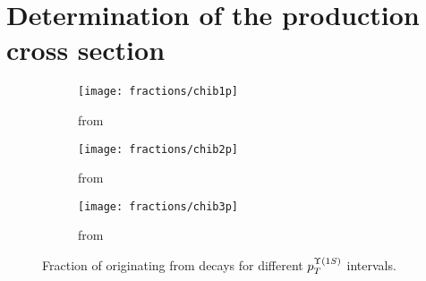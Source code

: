 \section{Determination of the \chib production cross section}
\label{sec:crosssec}

\begin{figure}[H]
  \centering
    \begin{subfigure}[b]{0.31\textwidth}
      \centering
      \texttt{[image: fractions/chib1p]}
      \caption{from \chibOneP}
      \label{fig:fraction_1p}
    \end{subfigure}
    \begin{subfigure}[b]{0.31\textwidth}
      \centering
      \texttt{[image: fractions/chib2p]}
      \caption{from \chibTwoP}
      \label{fig:fraction_2p}
    \end{subfigure}
    \begin{subfigure}[b]{0.31\textwidth}
      \centering
      \texttt{[image: fractions/chib3p]}
      \caption{from \chibThreeP}
      \label{fig:fraction_3p}
    \end{subfigure}    
  \caption{
    \small  Fraction of \OneS originating from \chib decays for 
    different $p_{T}^{\OneS}$ intervals.
  }
  \label{fig:chib_fractions}
\end{figure}

